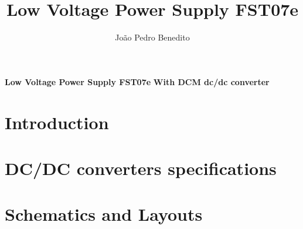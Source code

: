 \documentclass{article}
\title{Low Voltage Power Supply FST07e}
\author{João Pedro Benedito}
\begin{document}
\begin{center}
	\textbf{{\huge Low Voltage Power Supply FST07e}}
	\textbf{{\huge With DCM dc/dc converter}}
\end{center}

\section{Introduction}

\newpage


\newpage

\section{DC/DC converters specifications}

\newpage

\section{Schematics and Layouts}

\end{document}

